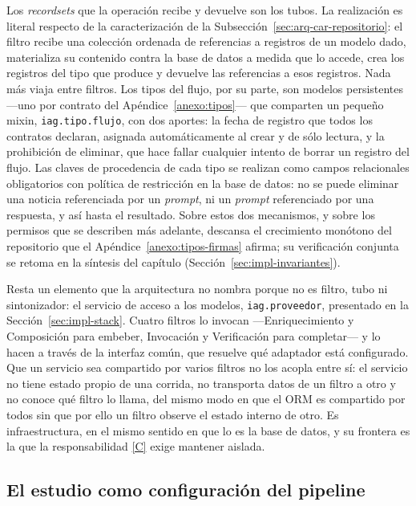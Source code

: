\documentclass[12pt]{report}
\DeclareRobustCommand{\resp}[1]{\hyperref[tab:registro-responsabilidades]{\textcolor{respcolor}{[#1]}}}
\begin{document}
Los \textit{recordsets} que la operación recibe y devuelve son los tubos. La realización es literal respecto de la caracterización de la Subsección~\ref{sec:arq-car-repositorio}: el filtro recibe una colección ordenada de referencias a registros de un modelo dado, materializa su contenido contra la base de datos a medida que lo accede, crea los registros del tipo que produce y devuelve las referencias a esos registros. Nada más viaja entre filtros. Los tipos del flujo, por su parte, son modelos persistentes ---uno por contrato del Apéndice~\ref{anexo:tipos}--- que comparten un pequeño mixin, \texttt{iag.tipo.flujo}, con dos aportes: la fecha de registro que todos los contratos declaran, asignada automáticamente al crear y de sólo lectura, y la prohibición de eliminar, que hace fallar cualquier intento de borrar un registro del flujo. Las claves de procedencia de cada tipo se realizan como campos relacionales obligatorios con política de restricción en la base de datos: no se puede eliminar una noticia referenciada por un \textit{prompt}, ni un \textit{prompt} referenciado por una respuesta, y así hasta el resultado. Sobre estos dos mecanismos, y sobre los permisos que se describen más adelante, descansa el crecimiento monótono del repositorio que el Apéndice~\ref{anexo:tipos-firmas} afirma; su verificación conjunta se retoma en la síntesis del capítulo (Sección~\ref{sec:impl-invariantes}).

Resta un elemento que la arquitectura no nombra porque no es filtro, tubo ni sintonizador: el servicio de acceso a los modelos, \texttt{iag.proveedor}, presentado en la Sección~\ref{sec:impl-stack}. Cuatro filtros lo invocan ---Enriquecimiento y Composición para embeber, Invocación y Verificación para completar--- y lo hacen a través de la interfaz común, que resuelve qué adaptador está configurado. Que un servicio sea compartido por varios filtros no los acopla entre sí: el servicio no tiene estado propio de una corrida, no transporta datos de un filtro a otro y no conoce qué filtro lo llama, del mismo modo en que el ORM es compartido por todos sin que por ello un filtro observe el estado interno de otro. Es infraestructura, en el mismo sentido en que lo es la base de datos, y su frontera es la que la responsabilidad \resp{C} exige mantener aislada.

\subsection{El estudio como configuración del pipeline}
\label{sec:impl-mat-estudio}
\end{document}
